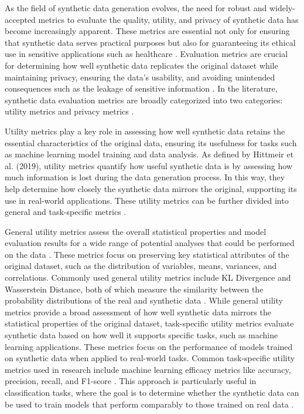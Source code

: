 \documentclass[11pt]{article}
\begin{document}
As the field of synthetic data generation evolves, the need for robust and widely-accepted metrics to evaluate the quality, utility, and privacy of synthetic data has become increasingly apparent. These metrics are essential not only for ensuring that synthetic data serves practical purposes but also for guaranteeing its ethical use in sensitive applications such as healthcare \parencite{kaabachi_scoping_2024}. Evaluation metrics are crucial for determining how well synthetic data replicates the original dataset while maintaining privacy, ensuring the data’s usability, and avoiding unintended consequences such as the leakage of sensitive information \parencite{jordon_synthetic_2022,kaabachi_scoping_2024}. In the literature, synthetic data evaluation metrics are broadly categorized into two categories: utility metrics and privacy metrics \parencite{goncalves_generation_2020,kaabachi_scoping_2024}. 

Utility metrics play a key role in assessing how well synthetic data retains the essential characteristics of the original data, ensuring its usefulness for tasks such as machine learning model training and data analysis. As defined by Hittmeir et al. (2019), utility metrics quantify how useful synthetic data is by assessing how much information is lost during the data generation process.  In this way, they help determine how closely the synthetic data mirrors the original, supporting its use in real-world applications. These utility metrics can be further divided into general and task-specific metrics \parencite{kaabachi_scoping_2024,osorio-marulanda_privacy_2024}.

General utility metrics assess the overall statistical properties and model evaluation results for a wide range of potential analyses that could be performed on the data \parencite{el_emam_seven_2020}. These metrics focus on preserving key statistical attributes of the original dataset, such as the distribution of variables, means, variances, and correlations. Commonly used general utility metrics include KL Divergence and Wasserstein Distance, both of which measure the similarity between the probability distributions of the real and synthetic data \parencite{fonseca_tabular_2023}. While general utility metrics provide a broad assessment of how well synthetic data mirrors the statistical properties of the original dataset, task-specific utility metrics evaluate synthetic data based on how well it supports specific tasks, such as machine learning applications. These metrics focus on the performance of models trained on synthetic data when applied to real-world tasks. Common task-specific utility metrics used in research include machine learning efficacy metrics like accuracy, precision, recall, and F1-score \parencite{figueira_survey_2022}. This approach is particularly useful in classification tasks, where the goal is to determine whether the synthetic data can be used to train models that perform comparably to those trained on real data \parencite{kaabachi_scoping_2024}. 
\end{document}
